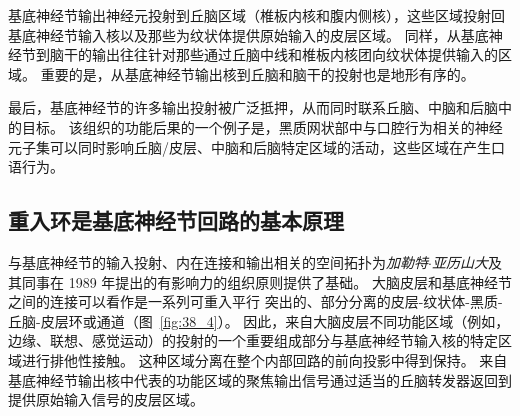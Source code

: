 基底神经节输出神经元投射到丘脑区域（椎板内核和腹内侧核），这些区域投射回基底神经节输入核以及那些为纹状体提供原始输入的皮层区域。
同样，从基底神经节到脑干的输出往往针对那些通过丘脑中线和椎板内核团向纹状体提供输入的区域。
重要的是，从基底神经节输出核到丘脑和脑干的投射也是地形有序的。


最后，基底神经节的许多输出投射被广泛抵押，从而同时联系丘脑、中脑和后脑中的目标。
该组织的功能后果的一个例子是，黑质网状部中与口腔行为相关的神经元子集可以同时影响丘脑/皮层、中脑和后脑特定区域的活动，这些区域在产生口语行为。



\subsection{重入环是基底神经节回路的基本原理}

与基底神经节的输入投射、内在连接和输出相关的空间拓扑为\textit{加勒特$\cdot$亚历山大}及其同事在 1989 年提出的有影响力的组织原则提供了基础。
大脑皮层和基底神经节之间的连接可以看作是一系列可重入平行 突出的、部分分离的皮层-纹状体-黑质-丘脑-皮层环或通道（图~\ref{fig:38_4}）。
因此，来自大脑皮层不同功能区域（例如，边缘、联想、感觉运动）的投射的一个重要组成部分与基底神经节输入核的特定区域进行排他性接触。
这种区域分离在整个内部回路的前向投影中得到保持。
来自基底神经节输出核中代表的功能区域的聚焦输出信号通过适当的丘脑转发器返回到提供原始输入信号的皮层区域。



